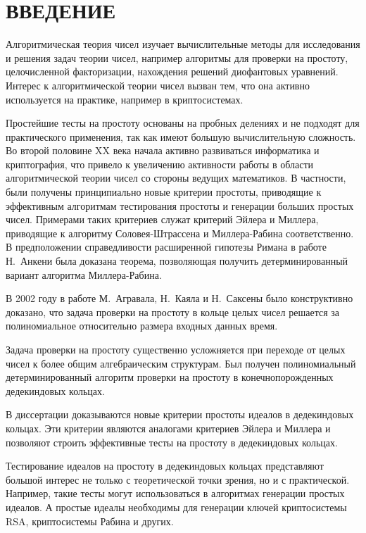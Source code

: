 \documentclass[_00_autoref.tex]{subfiles}
\begin{document}
\chapter*{\MakeUppercase{Введение}\vspace{-2ex}}

Алгоритмическая теория чисел изучает вычислительные методы для исследования и решения задач теории чисел, например алгоритмы для проверки на простоту, целочисленной факторизации, нахождения решений диофантовых уравнений.
Интерес к алгоритмической теории чисел вызван тем, что она активно используется на практике, например в криптосистемах.

Простейшие тесты на простоту основаны на пробных делениях и не подходят для практического применения, так как имеют большую вычислительную сложность.
Во второй половине XX века начала активно развиваться информатика и криптография, что привело к увеличению активности работы в области алгоритмической теории чисел со стороны ведущих математиков.
В частности, были получены принципиально новые критерии простоты, приводящие к эффективным алгоритмам тестирования простоты и генерации больших простых чисел.
Примерами таких критериев служат критерий Эйлера и Миллера, приводящие к алгоритму Соловея-Штрассена и Миллера-Рабина соответственно.
В предположении справедливости расширенной гипотезы Римана в работе Н.~Анкени была доказана теорема, позволяющая получить детерминированный вариант алгоритма Миллера-Рабина.

В 2002 году в работе М.~Агравала, Н.~Каяла и Н.~Саксены было конструктивно доказано, что задача проверки на простоту в кольце целых чисел решается за полиномиальное относительно размера входных данных время.

Задача проверки на простоту существенно усложняется при переходе от целых чисел к более общим алгебраическим структурам.
Был получен полиномиальный детерминированный алгоритм проверки на простоту в конечнопорожденных дедекиндовых кольцах.

В диссертации доказываются новые критерии простоты идеалов в дедекиндовых кольцах.
Эти критерии являются аналогами критериев Эйлера и Миллера и позволяют строить эффективные тесты на простоту в дедекиндовых кольцах.

Тестирование идеалов на простоту в дедекиндовых кольцах представляют большой интерес не только с теоретической точки зрения, но и с практической.
Например, такие тесты могут использоваться в алгоритмах генерации простых идеалов.
А простые идеалы необходимы для генерации ключей криптосистемы RSA, криптосистемы Рабина и других.
\end{document}
